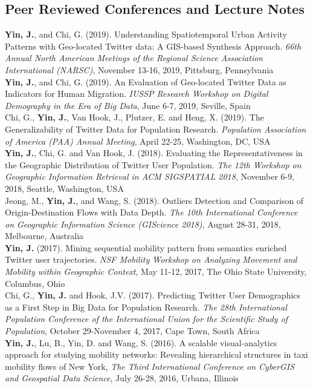 \documentclass[11pt, a4paper]{article}
\newcommand{\years}[1]{\marginnote{\scriptsize #1}}
\begin{document}
\subsection*{Peer Reviewed Conferences and Lecture Notes}
\noindent
\years{2019}\textbf{Yin, J.}, and Chi, G. (2019). Understanding Spatiotemporal Urban Activity Patterns with Geo-located Twitter data: A GIS-based Synthesis Approach. \textit{66th Annual North American Meetings of the Regional Science Association International (NARSC)}, November 13-16, 2019, Pittsburg, Pennsylvania\\
\years{2019}\textbf{Yin, J.}, and Chi, G. (2019). An Evaluation of Geo-located Twitter Data as Indicators for Human Migration. \textit{IUSSP Research Workshop on Digital Demography in the Era of Big Data}, June 6-7, 2019, Seville, Spain\\
\years{2019}Chi, G., \textbf{Yin, J.}, Van Hook, J., Plutzer, E. and Heng, X. (2019). The Generalizability of Twitter Data for Population Research. \textit{Population Association of America (PAA) Annual Meeting}, April 22-25, Washington, DC, USA\\
\years{2018}\textbf{Yin, J.}, Chi, G. and Van Hook, J. (2018). Evaluating the Representativeness in the Geographic Distribution of Twitter User Population. \textit{The 12th Workshop on Geographic Information Retrieval in ACM SIGSPATIAL 2018}, November 6-9, 2018, Seattle, Washington, USA\\
\years{2018}Jeong, M., \textbf{Yin, J.}, and Wang, S. (2018). Outliers Detection and Comparison of Origin-Destination Flows with Data Depth. \textit{The 10th International Conference on Geographic Information Science (GIScience 2018)}, August 28-31, 2018, Melbourne, Australia\\
\years{2017}\textbf{Yin, J.} (2017). Mining sequential mobility pattern from semantics enriched Twitter user trajectories. \textit{NSF Mobility Workshop on Analyzing Movement and Mobility within Geographic Context}, May 11-12, 2017, The Ohio State University, Columbus, Ohio\\
\years{2017}Chi, G., \textbf{Yin, J.} and Hook, J.V. (2017). Predicting Twitter User Demographics as a First Step in Big Data for Population Research. \textit{The 28th International Population Conference of the International Union for the Scientific Study of Population}, October 29-November 4, 2017, Cape Town, South Africa\\
\years{2016}\textbf{Yin, J.}, Lu, B., Yin, D. and Wang, S. (2016). A scalable visual-analytics approach for studying mobility networks: Revealing hierarchical structures in taxi mobility flows of New York, \textit{The Third International Conference on CyberGIS and Geospatial Data Science}, July 26-28, 2016, Urbana, Illinois\\
\end{document}
